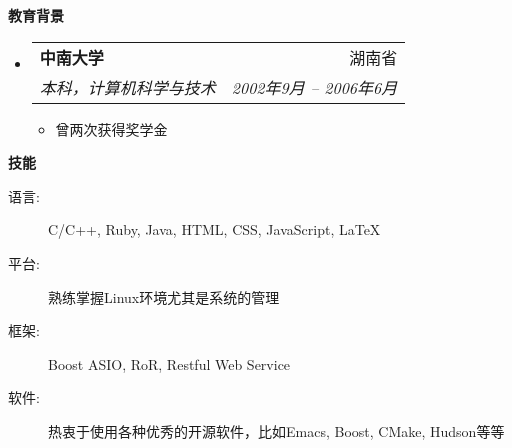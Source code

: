 \documentclass[letterpaper,11pt]{article}
\makeatletter
\newcommand{\resitem}[1]{\item #1 \vspace{-2pt}}
\newcommand{\resheading}[1]{{\large \colorbox{mygrey}{\begin{minipage}{\textwidth}{\textbf{#1 \vphantom{p\^{E}}}}\end{minipage}}}}
\newcommand{\ressubheading}[4]{
\begin{tabular*}{6.5in}{l@{\extracolsep{\fill}}r}
  \textbf{#1} & #2 \\
  \textit{#3} & \textit{#4} \\
\end{tabular*}\vspace{-6pt}}
\makeatother
\begin{document}
\resheading{教育背景}
\begin{itemize}
\item \ressubheading{中南大学}{湖南省}{%
    本科，计算机科学与技术}{2002年9月 -- 2006年6月}

  { \footnotesize
    \begin{itemize}
      \resitem{曾两次获得奖学金}
    \end{itemize}
  }

\end{itemize} %

\resheading{技能}
  \begin{description}
    \item[语言:] { \footnotesize C/C++, Ruby, Java, HTML, CSS, JavaScript, \LaTeX } 
    \item[平台:] { \footnotesize 熟练掌握Linux环境尤其是系统的管理 }
        \item[框架:] { \footnotesize Boost ASIO, RoR, Restful Web Service}
    \item[软件:] { \footnotesize 热衷于使用各种优秀的开源软件，比如Emacs,
          Boost, CMake, Hudson等等 }
  \end{description} %
\end{document}
